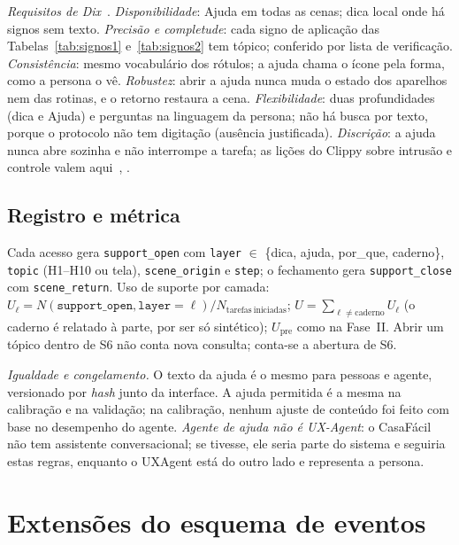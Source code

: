 \documentclass[conference,onecolumn]{IEEEtran}
\newcommand{\ev}[1]{\texttt{#1}}
\begin{document}
\textit{Requisitos de Dix}~\cite[cap.~11]{dix2004}. \textit{Disponibilidade}: Ajuda em todas as cenas; dica local onde há signos sem texto. \textit{Precisão e completude}: cada signo de aplicação das Tabelas~\ref{tab:signos1} e~\ref{tab:signos2} tem tópico; conferido por lista de verificação. \textit{Consistência}: mesmo vocabulário dos rótulos; a ajuda chama o ícone pela forma, como a persona o vê. \textit{Robustez}: abrir a ajuda nunca muda o estado dos aparelhos nem das rotinas, e o retorno restaura a cena. \textit{Flexibilidade}: duas profundidades (dica e Ajuda) e perguntas na linguagem da persona; não há busca por texto, porque o protocolo não tem digitação (ausência justificada). \textit{Discrição}: a ajuda nunca abre sozinha e não interrompe a tarefa; as lições do Clippy sobre intrusão e controle valem aqui~\cite{dix2004}, \cite{preece2002}.

\subsection{Registro e métrica}
Cada acesso gera \ev{support\_open} com \texttt{layer} $\in$ \{dica, ajuda, por\_que, caderno\}, \texttt{topic} (H1--H10 ou tela), \texttt{scene\_origin} e \texttt{step}; o fechamento gera \ev{support\_close} com \texttt{scene\_return}. Uso de suporte por camada: $U_{\ell} = N(\ev{support\_open}, \texttt{layer}=\ell) / N_{\mathrm{tarefas\ iniciadas}}$; $U = \sum_{\ell \neq \mathrm{caderno}} U_{\ell}$ (o caderno é relatado à parte, por ser só sintético); $U_{\mathrm{pre}}$ como na Fase~II. Abrir um tópico dentro de S6 não conta nova consulta; conta-se a abertura de S6.

\textit{Igualdade e congelamento.} O texto da ajuda é o mesmo para pessoas e agente, versionado por \textit{hash} junto da interface. A ajuda permitida é a mesma na calibração e na validação; na calibração, nenhum ajuste de conteúdo foi feito com base no desempenho do agente. \textit{Agente de ajuda não é UX-Agent}: o CasaFácil não tem assistente conversacional; se tivesse, ele seria parte do sistema e seguiria estas regras, enquanto o UXAgent está do outro lado e representa a persona.

\section{Extensões do esquema de eventos}\label{sec:eventos}
\end{document}
